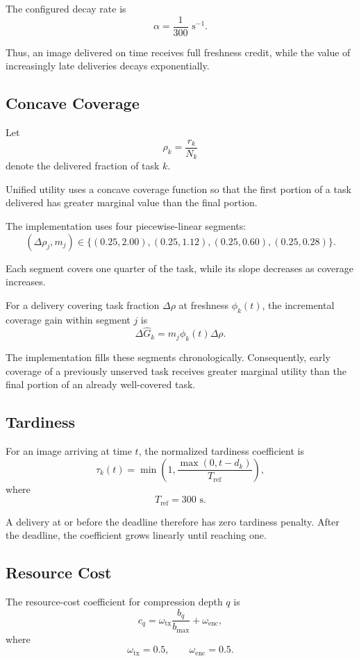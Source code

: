 \documentclass[11pt]{article}
\begin{document}
The configured decay rate is
\[
\alpha=\frac{1}{300}\text{ s}^{-1}.
\]

Thus, an image delivered on time receives full freshness credit, while the
value of increasingly late deliveries decays exponentially.


\subsection{Concave Coverage}

Let
\[
\rho_k=\frac{r_k}{N_k}
\]
denote the delivered fraction of task $k$.

Unified utility uses a concave coverage function so that the first portion of
a task delivered has greater marginal value than the final portion.

The implementation uses four piecewise-linear segments:
\[
(\Delta\rho_j,m_j)
\in
\{
(0.25,2.00),
(0.25,1.12),
(0.25,0.60),
(0.25,0.28)
\}.
\]

Each segment covers one quarter of the task, while its slope decreases as
coverage increases.

For a delivery covering task fraction $\Delta\rho$ at freshness
$\phi_k(t)$, the incremental coverage gain within segment $j$ is
\[
\Delta\widehat{G}_k
=
m_j\phi_k(t)\Delta\rho.
\]

The implementation fills these segments chronologically. Consequently,
early coverage of a previously unserved task receives greater marginal
utility than the final portion of an already well-covered task.


\subsection{Tardiness}

For an image arriving at time $t$, the normalized tardiness coefficient is
\[
\tau_k(t)
=
\min
\left(
1,
\frac{\max(0,t-d_k)}
{T_{\mathrm{ref}}}
\right),
\]
where
\[
T_{\mathrm{ref}}=300\text{ s}.
\]

A delivery at or before the deadline therefore has zero tardiness penalty.
After the deadline, the coefficient grows linearly until reaching one.


\subsection{Resource Cost}

The resource-cost coefficient for compression depth $q$ is
\[
c_q
=
\omega_{\mathrm{tx}}
\frac{b_q}{b_{\max}}
+
\omega_{\mathrm{enc}},
\]
where
\[
\omega_{\mathrm{tx}}=0.5,
\qquad
\omega_{\mathrm{enc}}=0.5.
\]
\end{document}

